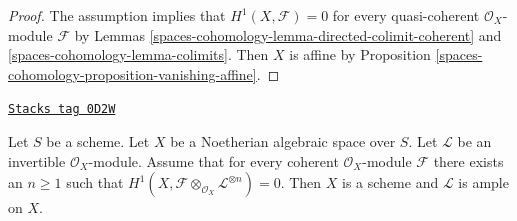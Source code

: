 \begin{proof}
The assumption implies that $H^1(X, \mathcal{F}) = 0$ for every quasi-coherent
$\mathcal{O}_X$-module $\mathcal{F}$ by
Lemmas \ref{spaces-cohomology-lemma-directed-colimit-coherent} and \ref{spaces-cohomology-lemma-colimits}.
Then $X$ is affine by
Proposition \ref{spaces-cohomology-proposition-vanishing-affine}.
\end{proof}

\begin{lemma}
\label{spaces-cohomology-lemma-Noetherian-h1-zero-invertible}
\href{https://stacks.math.columbia.edu/tag/0D2W}{\texttt{Stacks tag 0D2W}}

Let $S$ be a scheme. Let $X$ be a Noetherian algebraic space over $S$.
Let $\mathcal{L}$ be an invertible $\mathcal{O}_X$-module.
Assume that for every coherent $\mathcal{O}_X$-module
$\mathcal{F}$ there exists an $n \geq 1$ such that
$H^1(X, \mathcal{F} \otimes_{\mathcal{O}_X} \mathcal{L}^{\otimes n}) = 0$.
Then $X$ is a scheme and $\mathcal{L}$ is ample on $X$.
\end{lemma}

